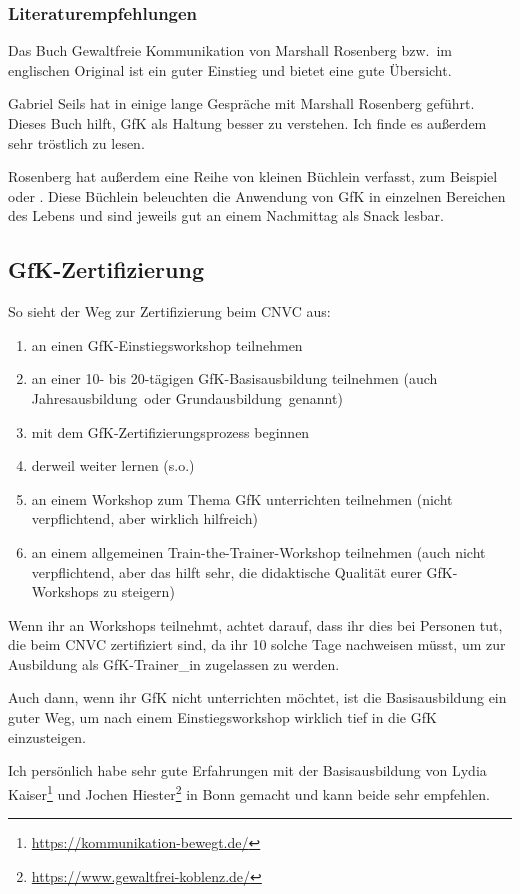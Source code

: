 \subsubsection{Literaturempfehlungen}

Das Buch \glqq Gewaltfreie Kommunikation\grqq{} von Marshall Rosenberg \cite{gfk-rosenberg} bzw.\ im englischen Original \cite{nvc-rosenberg} ist ein guter Einstieg und bietet eine gute Übersicht.

Gabriel Seils hat in \cite{gfk-gespraech} einige lange Gespräche mit Marshall Rosenberg geführt. Dieses Buch hilft, GfK als Haltung besser zu verstehen. Ich finde es außerdem sehr tröstlich zu lesen.

Rosenberg hat außerdem eine Reihe von kleinen Büchlein verfasst, zum Beispiel \cite{we-can-work-it-out} oder \cite{being-me-loving-you}. Diese Büchlein beleuchten die Anwendung von GfK in einzelnen Bereichen des Lebens und sind jeweils gut an einem Nachmittag als Snack lesbar.

\subsection{GfK-Zertifizierung}

So sieht der Weg zur Zertifizierung beim CNVC aus:

\begin{enumerate}
  \item an einen GfK-Einstiegsworkshop teilnehmen
  \item an einer 10- bis 20-tägigen GfK-Basisausbildung teilnehmen (auch \glqq Jahresausbildung\grqq\ oder \glqq Grundausbildung\grqq\ genannt)
  \item mit dem GfK-Zertifizierungsprozess\cite{gfk-trainer-werden} beginnen
  \item derweil weiter lernen (s.o.)
  \item an einem Workshop zum Thema \glqq GfK unterrichten\grqq{} teilnehmen (nicht verpflichtend, aber wirklich hilfreich)
  \item an einem allgemeinen Train-the-Trainer-Workshop teilnehmen (auch nicht verpflichtend, aber das hilft sehr, die didaktische Qualität eurer GfK-Workshops zu steigern)
\end{enumerate}

Wenn ihr an Workshops teilnehmt, achtet darauf, dass ihr dies bei Personen tut, die beim CNVC zertifiziert sind, da ihr 10 solche Tage nachweisen müsst, um zur Ausbildung als GfK-Trainer\_in zugelassen zu werden.

Auch dann, wenn ihr GfK nicht unterrichten möchtet, ist die Basisausbildung ein guter Weg, um nach einem Einstiegsworkshop wirklich tief in die GfK einzusteigen.

Ich persönlich habe sehr gute Erfahrungen mit der Basisausbildung von Lydia Kaiser\footnote{\url{https://kommunikation-bewegt.de/}} und Jochen Hiester\footnote{\url{https://www.gewaltfrei-koblenz.de/}} in Bonn gemacht und kann beide sehr empfehlen.

